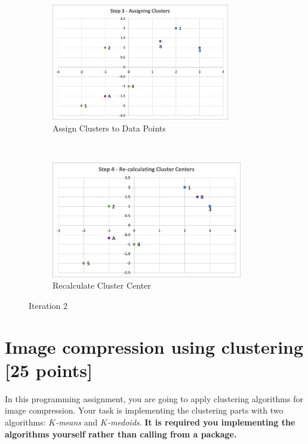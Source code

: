\documentclass[twoside,10pt]{article}
\begin{document}
\begin{itemize}
\begin{figure}[t!]
    \centering
    \begin{subfigure}[t]{0.5\textwidth}
        \centering
        \includegraphics[height=2in]{Images/Step3.png}
        \caption{Assign Clusters to Data Points}
    \end{subfigure}%
    ~ 
    \begin{subfigure}[t]{0.5\textwidth}
        \centering
        \includegraphics[height=2in]{Images/Step4.png}
        \caption{Recalculate Cluster Center}
    \end{subfigure}
    \caption{Iteration 2}
\end{figure}



   \end{itemize}


\section{Image compression using clustering [25 points]}

In this programming assignment, you are going to apply clustering algorithms for image compression. Your task is implementing the clustering parts with two algorithms: \emph{$K$-means} and \emph{$K$-medoids}.  {\bf It is required you implementing the algorithms yourself rather than calling from a package.} %
\end{document}
